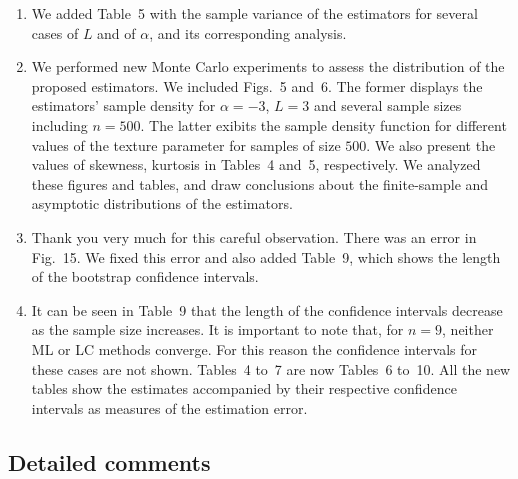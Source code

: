 \documentclass{ar2rc}
\begin{document}
	\begin{enumerate}
		\item We added Table~5 with the sample variance of the estimators for several cases of $L$ and of $\alpha$, and its corresponding analysis.
		
		\item We performed new Monte Carlo experiments to assess the distribution of the proposed estimators.
		We included Figs.~5 and~6. 
		The former displays the estimators' sample density for $\alpha=-3$, $L=3$ and several sample sizes including $n=500$. 
		The latter exibits the sample density function for different values of the texture parameter for samples of size $500$. 
		We also present the values of skewness, kurtosis in Tables~4 and~5, respectively. We analyzed these figures and tables, and draw conclusions about the finite-sample and asymptotic distributions of the estimators.
		
		\item Thank you very much for this careful observation. There was an error in Fig.~15. We fixed this error and also added Table~9, which shows the length of the bootstrap confidence intervals.
		
		\item It can be seen in Table~9 that the length of the confidence intervals decrease as the sample size increases. It is important to note that, for $n=9$, neither ML or LC methods converge. 
		For this reason the confidence intervals for these cases are not shown. Tables~4 to~7 are now Tables~6 to~10. 
		All the new tables show the estimates accompanied by their respective confidence intervals as measures of the estimation error. 
	\end{enumerate}
	
	
	
	
	\subsection{Detailed comments}
	
	
\end{document}
